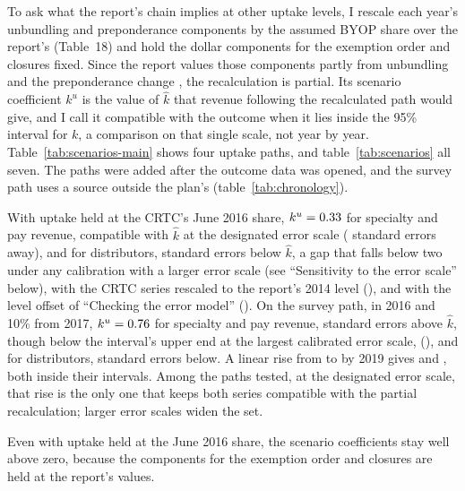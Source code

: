 To ask what the report's chain implies at other uptake levels, I rescale each year's unbundling and preponderance components by the assumed BYOP share over the report's (Table~18) and hold the dollar components for the exemption order and closures fixed. Since the report values those components partly from unbundling and the preponderance change \citep[paras.~220, 234]{nordicity2015television}, the recalculation is partial. Its scenario coefficient \(k^{u}\) is the value of \(\hat k\) that revenue following the recalculated path would give, and I call it compatible with the outcome when it lies inside the 95\% interval for \(k\), a comparison on that single scale, not year by year. Table~\ref{tab:scenarios-main} shows four uptake paths, and table~\ref{tab:scenarios} all seven. The paths were added after the outcome data was opened, and the survey path uses a source outside the plan's (table~\ref{tab:chronology}).



With uptake held at the CRTC's June 2016 share, \(k^{u}=0.33\) for specialty and pay revenue, compatible with \(\hat k\) at the designated error scale (\lttvKPredSpecObsUptakeSEs{} standard errors away), and \lttvKPredBDUObsUptake{} for distributors, \lttvKPredBDUObsUptakeSEs{} standard errors below \(\hat k\), a gap that falls below two under any calibration with a larger error scale (see \enquote{Sensitivity to the error scale} below), with the CRTC series rescaled to the report's 2014 level (\lttvBDUGapSEsRescaled{}), and with the level offset of \enquote{Checking the error model} (\lttvBDUGapSEsOffset{}). On the survey path, \lttvUptakeJuneShare{} in 2016 and 10\% from 2017, \(k^{u}=0.76\) for specialty and pay revenue, \lttvKPredSpecSurveySEs{} standard errors above \(\hat k\), though below the interval's upper end at the largest calibrated error scale, \lttvSigmaWidest{} (\lttvKSpecHiWidest{}), and \lttvKPredBDUSurvey{} for distributors, \lttvKPredBDUSurveySEs{} standard errors below. A linear rise from \lttvUptakeJuneShare{} to \lttvMorrisonUptake{} by 2019 gives \lttvKPredSpecRiseMorrison{} and \lttvKPredBDURiseMorrison{}, both inside their intervals. Among the paths tested, at the designated error scale, that rise is the only one that keeps both series compatible with the partial recalculation; larger error scales widen the set.

Even with uptake held at the June 2016 share, the scenario coefficients stay well above zero, because the components for the exemption order and closures are held at the report's values.

